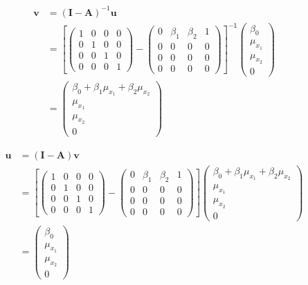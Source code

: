 \documentclass[
]{book}
\theoremstyle{definition}
\theoremstyle{definition}
\theoremstyle{definition}
\theoremstyle{remark}
\begin{document}
\begin{align*}\mathbf{v} &=\left( \mathbf{I} - \mathbf{A} \right)^{-1} \mathbf{u}\\ &=\left[\left( \begin{array}{cccc} 1 & 0 & 0 & 0 \\ 0 & 1 & 0 & 0 \\ 0 & 0 & 1 & 0 \\ 0 & 0 & 0 & 1 \end{array} \right)-\left( \begin{array}{cccc} 0 & \beta  _{1} & \beta  _{2} & 1 \\ 0 & 0 & 0 & 0 \\ 0 & 0 & 0 & 0 \\ 0 & 0 & 0 & 0 \end{array} \right)\right]^{\mathsf{-1}}\left( \begin{array}{c} \beta  _{0} \\ \mu  _{x_{1}} \\ \mu  _{x_{2}} \\ 0 \end{array} \right)\\ &=\left( \begin{array}{c} \beta  _{0} + \beta  _{1} \mu  _{x_{1}} + \beta  _{2} \mu  _{x_{2}} \\ \mu  _{x_{1}} \\ \mu  _{x_{2}} \\ 0 \end{array} \right)\end{align*}

\begin{align*}\mathbf{u} &=\left( \mathbf{I} - \mathbf{A} \right) \mathbf{v}\\ &=\left[\left( \begin{array}{cccc} 1 & 0 & 0 & 0 \\ 0 & 1 & 0 & 0 \\ 0 & 0 & 1 & 0 \\ 0 & 0 & 0 & 1 \end{array} \right)-\left( \begin{array}{cccc} 0 & \beta  _{1} & \beta  _{2} & 1 \\ 0 & 0 & 0 & 0 \\ 0 & 0 & 0 & 0 \\ 0 & 0 & 0 & 0 \end{array} \right)\right]\left( \begin{array}{c} \beta  _{0} + \beta  _{1} \mu  _{x_{1}} + \beta  _{2} \mu  _{x_{2}} \\ \mu  _{x_{1}} \\ \mu  _{x_{2}} \\ 0 \end{array} \right)\\ &=\left( \begin{array}{c} \beta  _{0} \\ \mu  _{x_{1}} \\ \mu  _{x_{2}} \\ 0 \end{array} \right)\end{align*}
\end{document}

